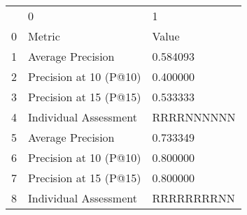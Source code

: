 \begin{tabular}{lll}
 & 0 & 1 \\
0 & Metric & Value \\
1 & Average Precision & 0.584093 \\
2 & Precision at 10 (P@10) & 0.400000 \\
3 & Precision at 15 (P@15) & 0.533333 \\
4 & Individual Assessment & RRRRNNNNNN \\
5 & Average Precision & 0.733349 \\
6 & Precision at 10 (P@10) & 0.800000 \\
7 & Precision at 15 (P@15) & 0.800000 \\
8 & Individual Assessment & RRRRRRRRNN \\
\end{tabular}
